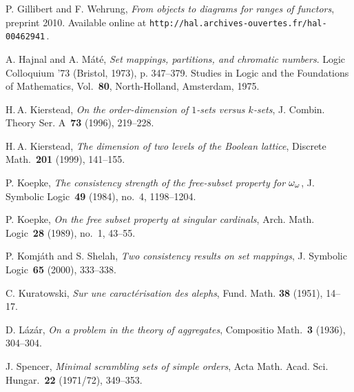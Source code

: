 \documentclass[psamsfonts,reqno]{amsart}
\theoremstyle{plain}
\theoremstyle{definition}
\theoremstyle{remark}
\numberwithin{equation}{section}
\numberwithin{figure}{section}
\newcommand{\go}{\omega}
\begin{document}
\begin{thebibliography}{99}
P. Gillibert and F. Wehrung, \emph{{}From objects to diagrams for ranges of functors}, preprint 2010. Available online at \texttt{http://hal.archives-ouvertes.fr/hal-00462941}\,.

A. Hajnal and A. M\'at\'e,
\emph{Set mappings, partitions, and chromatic numbers}. Logic Colloquium '73 (Bristol, 1973), p. 347--379. Studies in Logic and the Foundations of Mathematics, Vol.~\textbf{80}, North-Holland, Amsterdam, 1975.

H.\,A. Kierstead,
\emph{On the order-dimension of $1$-sets versus $k$-sets},
J. Combin. Theory Ser. A~\textbf{73} (1996), 219--228.

H.\,A. Kierstead,
\emph{The dimension of two levels of the Boolean lattice},
Discrete Math.~\textbf{201} (1999), 141--155.

P. Koepke,
\emph{The consistency strength of the free-subset property for $\go\sb\go$}, J. Symbolic Logic~\textbf{49} (1984), no.~4, 1198--1204.

P. Koepke,
\emph{On the free subset property at singular cardinals},
Arch. Math. Logic~\textbf{28} (1989), no.~1, 43--55.

P. Komj\'ath and S. Shelah,
\emph{Two consistency results on set mappings}, J. Symbolic Logic~\textbf{65} (2000), 333--338.

C. Kuratowski,
\emph{Sur une caract\'erisation des alephs},
Fund. Math. \textbf{38} (1951), 14--17.

D. L\'az\'ar,
\emph{On a problem in the theory of aggregates},
Compositio Math.~\textbf{3} (1936), 304--304.

J. Spencer, \emph{Minimal scrambling sets of simple orders}, Acta Math. Acad. Sci. Hungar.~\textbf{22} (1971/72), 349--353.

\end{thebibliography}
\end{document}
